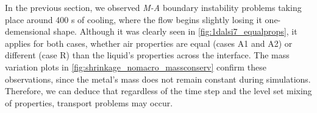 
In the previous section, we observed \emph{M-A} boundary instability problems taking place around 400 s of cooling, where the flow begins slightly losing it one-demensional
shape. Although it was clearly seen in \cref{fig:1dalsi7_equalprops}, it applies
for both cases, whether air properties are equal (cases A1 and A2) or different (case R) than the liquid's properties across the interface. 
The mass variation plots in \cref{fig:shrinkage_nomacro_massconserv} confirm these observations, since the metal's mass does not remain 
constant during simulations.
Therefore, we can deduce that regardless of the time step and the level set mixing of properties, 
transport problems may occur. 

